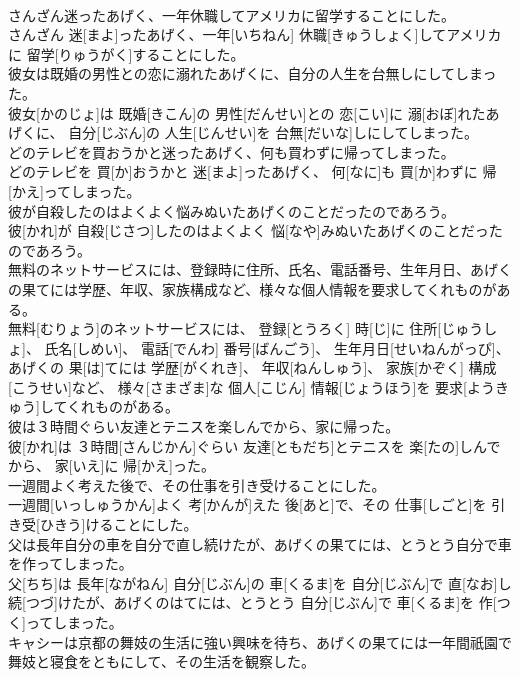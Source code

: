 \documentclass[8pt]{extreport}
\begin{document}
\begin{CJK}{UTF8}{min}
\\	さんざん迷ったあげく、一年休職してアメリカに留学することにした。	
\\	さんざん 迷[まよ]ったあげく、一年[いちねん] 休職[きゅうしょく]してアメリカに 留学[りゅうがく]することにした。
\\	彼女は既婚の男性との恋に溺れたあげくに、自分の人生を台無しにしてしまった。	
\\	彼女[かのじょ]は 既婚[きこん]の 男性[だんせい]との 恋[こい]に 溺[おぼ]れたあげくに、 自分[じぶん]の 人生[じんせい]を 台無[だいな]しにしてしまった。
\\	どのテレビを買おうかと迷ったあげく、何も買わずに帰ってしまった。	
\\	どのテレビを 買[か]おうかと 迷[まよ]ったあげく、 何[なに]も 買[か]わずに 帰[かえ]ってしまった。
\\	彼が自殺したのはよくよく悩みぬいたあげくのことだったのであろう。	
\\	彼[かれ]が 自殺[じさつ]したのはよくよく 悩[なや]みぬいたあげくのことだったのであろう。
\\	無料のネットサービスには、登録時に住所、氏名、電話番号、生年月日、あげくの果てには学歴、年収、家族構成など、様々な個人情報を要求してくれものがある。	
\\	無料[むりょう]のネットサービスには、 登録[とうろく] 時[じ]に 住所[じゅうしょ]、 氏名[しめい]、 電話[でんわ] 番号[ばんごう]、 生年月日[せいねんがっぴ]、あげくの 果[は]てには 学歴[がくれき]、 年収[ねんしゅう]、 家族[かぞく] 構成[こうせい]など、 様々[さまざま]な 個人[こじん] 情報[じょうほう]を 要求[ようきゅう]してくれものがある。
\\	彼は３時間ぐらい友達とテニスを楽しんでから、家に帰った。	
\\	彼[かれ]は ３時間[さんじかん]ぐらい 友達[ともだち]とテニスを 楽[たの]しんでから、 家[いえ]に 帰[かえ]った。
\\	一週間よく考えた後で、その仕事を引き受けることにした。	
\\	一週間[いっしゅうかん]よく 考[かんが]えた 後[あと]で、その 仕事[しごと]を 引き受[ひきう]けることにした。
\\	父は長年自分の車を自分で直し続けたが、あげくの果てには、とうとう自分で車を作ってしまった。	
\\	父[ちち]は 長年[ながねん] 自分[じぶん]の 車[くるま]を 自分[じぶん]で 直[なお]し 続[つづ]けたが、あげくのはてには、とうとう 自分[じぶん]で 車[くるま]を 作[つく]ってしまった。
\\	キャシーは京都の舞妓の生活に強い興味を待ち、あげくの果てには一年間祇園で舞妓と寝食をともにして、その生活を観察した。	

\end{CJK}
\end{document}
